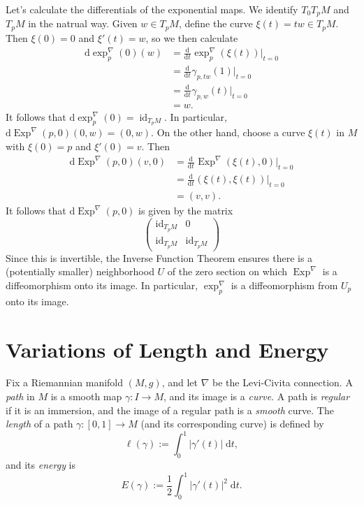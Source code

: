 \documentclass{book}
\renewcommand{\d}{\mathrm{d}}
\newcommand{\abs}[1]{\left\lvert {#1} \right\rvert}
\newcommand{\odv}[3][]{\frac{\d^{#1}#2}{\d{#3}^{#1}}}
\DeclareMathOperator{\id}{\mathrm{id}}
\DeclareMathOperator{\Exp}{\mathrm{Exp}}
\theoremstyle{definition}
\numberwithin{equation}{section}
\begin{document}
Let's calculate the differentials of the exponential maps. We identify $T_0 T_pM$ and $T_pM$ in the natrual way. Given $w \in T_pM$, define the curve $\xi(t) = tw \in T_pM$. Then $\xi(0) = 0$ and $\xi'(t) = w$, so we then calculate 
\begin{equation} \begin{aligned}
    \d\exp^\nabla_p(0)(w) &= \odv{}{t} \exp_p^\nabla(\xi(t)) \vert_{t=0} \\
                          &= \odv{}{t} \gamma_{p,tw}(1) \vert_{t=0} \\
                          &= \odv{}{t} \gamma_{p,w}(t) \vert_{t=0} \\
                          &= w.
\end{aligned} \end{equation}
It follows that $\d\exp^\nabla_p(0) = \id_{T_pM}$. In particular, $\d\Exp^\nabla(p,0)(0,w) = (0,w)$. On the other hand, choose a curve $\xi(t)$ in $M$ with $\xi(0) = p$ and $\xi'(0) = v$. Then 
\begin{equation} \begin{aligned}
    \d\Exp^\nabla(p,0)(v,0) &= \odv{}{t} \Exp^\nabla(\xi(t),0) \vert_{t=0} \\
                            &= \odv{}{t} (\xi(t),\xi(t)) \vert_{t=0} \\
                            &= (v,v).
\end{aligned} \end{equation}
It follows that $\d\Exp^\nabla(p,0)$ is given by the matrix 
\begin{equation}
    \begin{pmatrix}
        \id_{T_pM} & 0 \\
        \id_{T_pM} & \id_{T_pM}
    \end{pmatrix}
\end{equation}
Since this is invertible, the Inverse Function Theorem ensures there is a (potentially smaller) neighborhood $U$ of the zero section on which $\Exp^\nabla$ is a diffeomorphism onto its image. In particular, $\exp^\nabla_p$ is a diffeomorphism from $U_p$ onto its image.


\section{Variations of Length and Energy}

Fix a Riemannian manifold $(M,g)$, and let $\nabla$ be the Levi-Civita connection. A \textit{path} in $M$ is a smooth map $\gamma \colon I \to M$, and its image is a \textit{curve}. A path is \textit{regular} if it is an immersion, and the image of a regular path is a \textit{smooth} curve. The \textit{length} of a path $\gamma \colon [0,1] \to M$ (and its corresponding curve) is defined by 
\begin{equation}
    \ell(\gamma) := \int_0^1 \abs{\gamma'(t)} \; \d{t},
\end{equation}
and its \textit{energy} is 
\begin{equation}
    E(\gamma) := \frac{1}{2} \int_0^1 \abs{\gamma'(t)}^2 \; \d{t}.
\end{equation}
\end{document}

